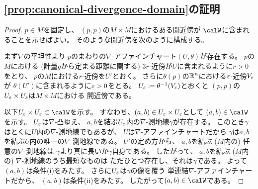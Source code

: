 \documentclass[report]{jlreq}
\begin{document}
\subsection{\cref{prop:canonical-divergence-domain}の証明}

\begin{proof}
    $p \in M$を固定し、
    $(p, p)$の$M \times M$におけるある開近傍が
    $\calW$に含まれることを示せばよい。
    そのような開近傍を次のように構成する。

    まず$\nabla$の平坦性より
    $p$のまわりの$\nabla$-アファインチャート$(U, \theta)$が存在する。
    $p$の$M$における
    (計量$g$から定まる距離に関する)
    $3r$-近傍が$U$に含まれるように$r > 0$をとり、
    $p$の$M$における$r$-近傍を$U'$とおく。
    さらに$\theta(p)$の$\mathbb{R}^n$における$\varepsilon$-近傍$V_\varepsilon$が
    $\theta(U')$に含まれるように$\varepsilon > 0$をとる。
    $U_\varepsilon \coloneqq \theta^{-1}(V_\varepsilon)$とおくと
    $(p, p)$の$U_\varepsilon \times U_\varepsilon$は$M \times M$における
    開近傍である。

    以下$U_\eps \times U_\eps \subset \calW$を示す。
    すなわち、$(a, b) \in U_\varepsilon \times U_\varepsilon$として
    $(a, b) \in \calW$を示す。
    $U_\varepsilon$は$\nabla$-凸ゆえ、
    $a, b$を結ぶ$U_\varepsilon$内の$\nabla$-測地線$\gamma$が存在する。
    このとき$\gamma$はとくに$U$内の$\nabla$-測地線でもあるが、
    $U$は$\nabla$-アファインチャートだから
    $\gamma$は$a, b$を結ぶ$U$内の唯一の$\nabla$-測地線である。
    $U'$の定め方から、
    $a, b$を結ぶ ($M$内の) 任意の$\nabla$-測地線は
    $\gamma$より真に長いか$\gamma$自身である。
    したがって、
    $a, b$を結ぶ ($M$内の) $\nabla$-測地線のうち最短なものは
    ただひとつ存在し、それは$\gamma$である。
    よって$(a, b)$は条件(i)をみたす。
    さらに$U_\varepsilon$は$\gamma$の像を覆う
    単連結$\nabla$-アファインチャートだから、
    $(a, b)$は条件(ii)をみたす。
    したがって$(a, b) \in \calW$である。
\end{proof}
\end{document}
